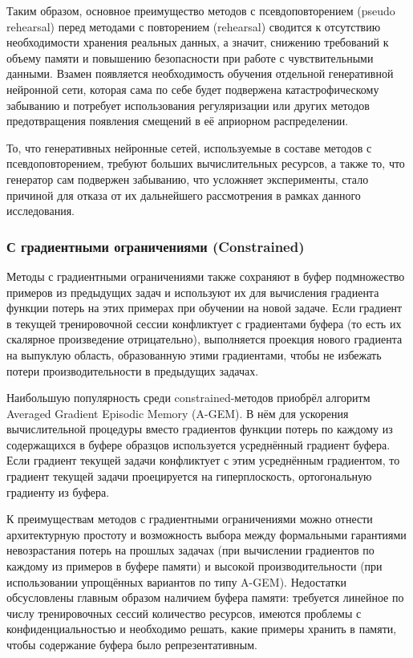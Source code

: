 \documentclass[a4paper,14pt]{extarticle}
\begin{document}
Таким образом, основное преимущество методов с псевдоповторением (pseudo
rehearsal) перед методами с повторением (rehearsal) сводится к отсутствию
необходимости хранения реальных данных, а значит, снижению требований к
объему памяти и повышению безопасности при работе с чувствительными данными.
Взамен появляется необходимость обучения отдельной генеративной нейронной сети,
которая сама по себе будет подвержена катастрофическому забыванию и потребует
использования регуляризации или других методов предотвращения появления смещений
в её априорном распределении.

То, что генеративных нейронные сетей, используемые в составе методов с
псевдоповторением, требуют больших вычислительных ресурсов, а также то, что
генератор сам подвержен забыванию, что усложняет эксперименты, стало причиной
для отказа от их дальнейшего рассмотрения в рамках данного исследования.
\subsubsection{С градиентными ограничениями (Constrained)}
Методы с градиентными ограничениями также сохраняют в буфер подмножество примеров
из предыдущих задач и используют их для вычисления градиента функции потерь на
этих примерах при обучении на новой задаче. Если градиент в текущей
тренировочной сессии конфликтует с градиентами буфера (то есть их скалярное
произведение отрицательно), выполняется проекция нового градиента на выпуклую
область, образованную этими градиентами, чтобы не избежать потери
производительности в предыдущих задачах.

Наибольшую популярность среди constrained-методов приобрёл алгоритм Averaged
Gradient Episodic Memory (A-GEM). В нём для ускорения вычислительной процедуры
вместо градиентов функции потерь по каждому из содержащихся в буфере образцов
используется усреднённый градиент буфера. Если градиент текущей задачи
конфликтует с этим усреднённым градиентом, то градиент текущей задачи
проецируется на гиперплоскость, ортогональную градиенту из буфера. 

К преимуществам методов с градиентными ограничениями можно отнести архитектурную
простоту и возможность выбора между формальными гарантиями невозрастания потерь
на прошлых задачах (при вычислении градиентов по каждому из примеров в
буфере памяти) и высокой производительности (при использовании упрощённых
вариантов по типу A-GEM). Недостатки обсусловлены главным образом наличием
буфера памяти: требуется линейное по числу тренировочных сессий
количество ресурсов, имеются проблемы с конфиденциальностью и необходимо решать,
какие примеры хранить в памяти, чтобы содержание буфера было репрезентативным. 
\end{document}
